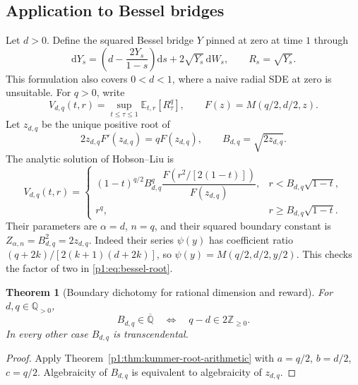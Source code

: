 \documentclass[11pt,a4paper]{article}
\newtheorem{theorem}{Theorem}[section]
\theoremstyle{definition}
\theoremstyle{remark}
\numberwithin{equation}{section}
\begin{document}
\subsection{Application to Bessel bridges}

Let $d>0$. Define the squared Bessel bridge $Y$ pinned at zero at time
$1$ through
\[
 \mathrm dY_s=\left(d-\frac{2Y_s}{1-s}\right)\mathrm ds
             +2\sqrt{Y_s}\,\mathrm dW_s,
 \qquad R_s=\sqrt{Y_s}.
\]
This formulation also covers $0<d<1$, where a naive radial SDE at zero
is unsuitable. For $q>0$, write
\[
 V_{d,q}(t,r)=\sup_{t\le\tau\le1}\mathbb E_{t,r}[R_\tau^q],
 \qquad F(z)=M(q/2,d/2,z).
\]
Let $z_{d,q}$ be the unique positive root of
\begin{equation}\label{p1:eq:bessel-root}
 2z_{d,q}F'(z_{d,q})=qF(z_{d,q}),
 \qquad B_{d,q}=\sqrt{2z_{d,q}}.
\end{equation}
The analytic solution of Hobson--Liu \cite[Theorem~3.1]{p1:HobsonLiu2026}
is
\begin{equation}\label{p1:eq:bessel-value}
 V_{d,q}(t,r)=
 \begin{cases}
 (1-t)^{q/2}B_{d,q}^q
 \dfrac{F(r^2/[2(1-t)])}{F(z_{d,q})},
       &r<B_{d,q}\sqrt{1-t},\\[6pt]
 r^q,&r\ge B_{d,q}\sqrt{1-t}.
 \end{cases}
\end{equation}
Their parameters are $\alpha=d$, $n=q$, and their squared boundary
constant is $Z_{\alpha,n}=B_{d,q}^2=2z_{d,q}$.
Indeed their series $\psi(y)$ has coefficient ratio
$(q+2k)/[2(k+1)(d+2k)]$, so
$\psi(y)=M(q/2,d/2,y/2)$. This checks the factor of two in
\eqref{p1:eq:bessel-root}.

\begin{theorem}[Boundary dichotomy for rational dimension and reward]
\label{p1:thm:bessel-arithmetic}
For $d,q\in\mathbb Q_{>0}$,
\[
 B_{d,q}\in\overline{\mathbb Q}
 \quad\Longleftrightarrow\quad
 q-d\in2\mathbb Z_{\ge0}.
\]
In every other case $B_{d,q}$ is transcendental.
\end{theorem}
\begin{proof}
Apply Theorem~\ref{p1:thm:kummer-root-arithmetic} with
$a=q/2$, $b=d/2$, $c=q/2$. Algebraicity of $B_{d,q}$ is equivalent to
algebraicity of $z_{d,q}$.
\end{proof}
\end{document}
